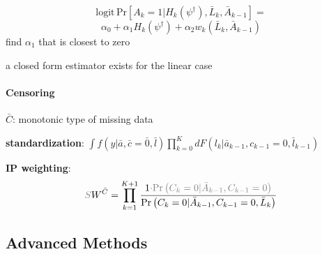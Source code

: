 \documentclass[8pt]{extarticle}
\begin{document}
\begin{multicols}{2}
$$\mathrm{logit}\,\mathrm{Pr}\left[A_k=1|H_k\left(\psi^\dagger\right), \bar{L}_k,\bar{A}_{k-1}\right]=$$
$$\alpha_0 +\alpha_1H_k\left(\psi^\dagger\right)+\alpha_2 w_k\left(\bar{L}_k,\bar{A}_{k-1}\right)
$$
find $\alpha_1$ that is closest to zero

a closed form estimator exists for the linear case



\paragraph{\large Censoring} $\bar{C}$: monotonic type of missing data 

\noindent \textbf{standardization}: $\int f(y|\bar{a}, \bar{c}{=}\bar{0}, \bar{l}) \prod_{k=0}^K dF\left(l_k|\bar{a}_{k-1}, c_{k-1} {=} 0, \bar{l}_{k-1}\right)$

\noindent \textbf{IP weighting}:
\noindent $$\textcolor{gray}{S}W^{\bar{C}}= \prod_{k=1}^{K+1}\frac{1\textcolor{gray}{\cdot \mathrm{Pr}\left(C_k=0|\bar{A}_{k-1}, C_{k-1}=0\right)}}{\mathrm{Pr}\left(C_k=0|\bar{A}_{k-1}, C_{k-1}=0, \bar{L}_k\right)} $$










\end{multicols}



\subsection{Advanced Methods}
\end{document}
